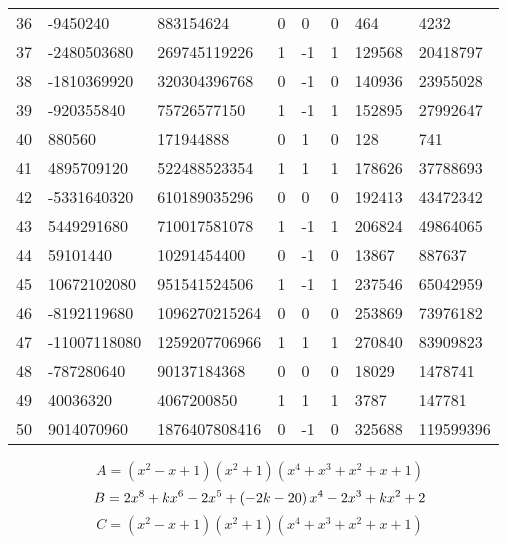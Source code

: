 \documentclass{amsart}
\begin{document}
\begin{longtable}{|l|l|l|lllll|}
36&-9450240&883154624&0&0&0&464&4232\\
37&-2480503680&269745119226&1&-1&1&129568&20418797\\
38&-1810369920&320304396768&0&-1&0&140936&23955028\\
39&-920355840&75726577150&1&-1&1&152895&27992647\\
40&880560&171944888&0&1&0&128&741\\
41&4895709120&522488523354&1&1&1&178626&37788693\\
42&-5331640320&610189035296&0&0&0&192413&43472342\\
43&5449291680&710017581078&1&-1&1&206824&49864065\\
44&59101440&10291454400&0&-1&0&13867&887637\\
45&10672102080&951541524506&1&-1&1&237546&65042959\\
46&-8192119680&1096270215264&0&0&0&253869&73976182\\
47&-11007118080&1259207706966&1&1&1&270840&83909823\\
48&-787280640&90137184368&0&0&0&18029&1478741\\
49&40036320&4067200850&1&1&1&3787&147781\\
50&9014070960&1876407808416&0&-1&0&325688&119599396\\
\hline
\end{longtable}
$$A=(x^2
 - x
 + 1)(x^2
 + 1)(x^4
 + x^3
 + x^2
 + x
 + 1)$$
$$B=2\*x^8
 + k\*x^6
 - 2\*x^5
 + \left(-2\*k
 - 20\right) \*x^4
 - 2\*x^3
 + k\*x^2
 + 2$$
$$C=(x^2
 - x
 + 1)(x^2
 + 1)(x^4
 + x^3
 + x^2
 + x
 + 1)$$
\end{document}
